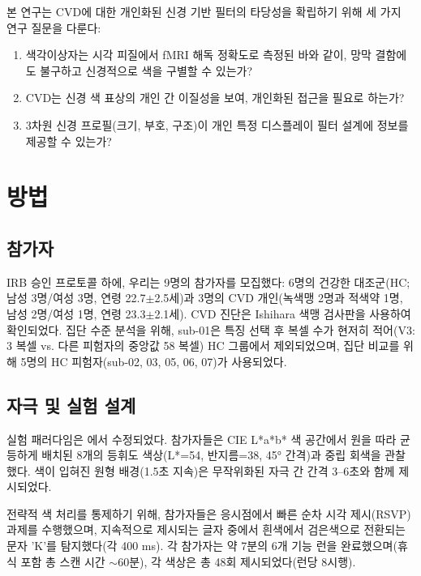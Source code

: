 \documentclass[12pt,a4paper]{article}
\begin{document}
본 연구는 CVD에 대한 개인화된 신경 기반 필터의 타당성을 확립하기 위해 세 가지 연구 질문을 다룬다:
\begin{enumerate}
\item 색각이상자는 시각 피질에서 fMRI 해독 정확도로 측정된 바와 같이, 망막 결함에도 불구하고 신경적으로 색을 구별할 수 있는가?
\item CVD는 신경 색 표상의 개인 간 이질성을 보여, 개인화된 접근을 필요로 하는가?
\item 3차원 신경 프로필(크기, 부호, 구조)이 개인 특정 디스플레이 필터 설계에 정보를 제공할 수 있는가?
\end{enumerate}

\section{방법}

\subsection{참가자}

IRB 승인 프로토콜 하에, 우리는 9명의 참가자를 모집했다: 6명의 건강한 대조군(HC; 남성 3명/여성 3명, 연령 22.7$\pm$2.5세)과 3명의 CVD 개인(녹색맹 2명과 적색약 1명, 남성 2명/여성 1명, 연령 23.3$\pm$2.1세). CVD 진단은 Ishihara 색맹 검사판을 사용하여 확인되었다. 집단 수준 분석을 위해, sub-01은 특징 선택 후 복셀 수가 현저히 적어(V3: 3 복셀 vs. 다른 피험자의 중앙값 58 복셀) HC 그룹에서 제외되었으며, 집단 비교를 위해 5명의 HC 피험자(sub-02, 03, 05, 06, 07)가 사용되었다.

\subsection{자극 및 실험 설계}

실험 패러다임은 \textcite{Brouwer2009}에서 수정되었다. 참가자들은 CIE L*a*b* 색 공간에서 원을 따라 균등하게 배치된 8개의 등휘도 색상(L*=54, 반지름=38, 45° 간격)과 중립 회색을 관찰했다. 색이 입혀진 원형 배경(1.5초 지속)은 무작위화된 자극 간 간격 3--6초와 함께 제시되었다.

전략적 색 처리를 통제하기 위해, 참가자들은 응시점에서 빠른 순차 시각 제시(RSVP) 과제를 수행했으며, 지속적으로 제시되는 글자 중에서 흰색에서 검은색으로 전환되는 문자 'K'를 탐지했다(각 400 ms). 각 참가자는 약 7분의 6개 기능 런을 완료했으며(휴식 포함 총 스캔 시간 $\sim$60분), 각 색상은 총 48회 제시되었다(런당 8시행).
\end{document}
